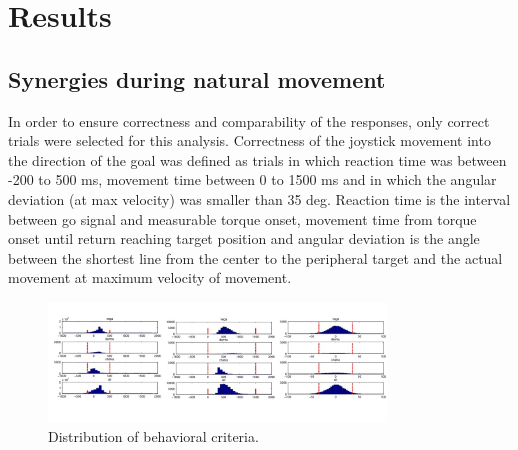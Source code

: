 \chapter{Results} %
\label{sg:cha:results}

\section{Synergies during natural movement} %
\label{sg:sec:nat_mov_syns}


In order to ensure correctness and comparability of the responses, only correct trials were selected for this analysis. Correctness of the joystick movement into the direction of the goal was defined as trials in which reaction time was between -200 to 500 ms, movement time between 0 to 1500 ms and in which the angular deviation (at max velocity) was smaller than 35 deg. Reaction time is the interval between go signal and measurable torque onset, movement time from torque onset until return reaching target position and angular deviation is the angle between the shortest line from the center to the peripheral target and the actual movement at maximum velocity of movement.
\begin{figure}[ht]
    \centering
        \includegraphics[width=0.8\textwidth]{images/behav_crit.jpg}
    \caption{Distribution of behavioral criteria.}
    \label{sg:fig:images_behav_crit}
\end{figure}


